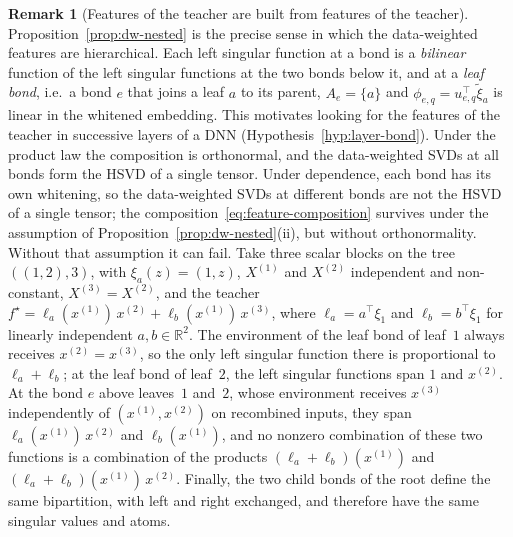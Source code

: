 \documentclass[11pt]{article}
\newcommand{\R}{\mathbb{R}}
\theoremstyle{definition}
\newtheorem{remark}[theorem]{Remark}
\numberwithin{equation}{section}
\begin{document}
\begin{remark}[Features of the teacher are built from features of the teacher]\label{rem:dw-nested}
Proposition~\ref{prop:dw-nested} is the precise sense in which the data-weighted features are hierarchical. Each left singular function at a bond is a \emph{bilinear} function of the left singular functions at the two bonds below it, and at a \emph{leaf bond}, i.e.\ a bond $e$ that joins a leaf $a$ to its parent, $A_e=\{a\}$ and $\phi_{e,q}=u^\top_{e,q}\tilde\xi_a$ is linear in the whitened embedding. This motivates looking for the features of the teacher in successive layers of a DNN (Hypothesis~\ref{hyp:layer-bond}). Under the product law the composition is orthonormal, and the data-weighted SVDs at all bonds form the HSVD of a single tensor. Under dependence, each bond has its own whitening, so the data-weighted SVDs at different bonds are not the HSVD of a single tensor; the composition~\eqref{eq:feature-composition} survives under the assumption of Proposition~\ref{prop:dw-nested}(ii), but without orthonormality. Without that assumption it can fail. Take three scalar blocks on the tree $((1,2),3)$, with $\xi_a(z)=(1,z)$, $X^{(1)}$ and $X^{(2)}$ independent and non-constant, $X^{(3)}=X^{(2)}$, and the teacher $f^\star=\ell_a(x^{(1)})\,x^{(2)}+\ell_b(x^{(1)})\,x^{(3)}$, where $\ell_a=a^\top\xi_1$ and $\ell_b=b^\top\xi_1$ for linearly independent $a,b\in\R^2$. The environment of the leaf bond of leaf~$1$ always receives $x^{(2)}=x^{(3)}$, so the only left singular function there is proportional to $\ell_a+\ell_b$; at the leaf bond of leaf~$2$, the left singular functions span $1$ and $x^{(2)}$. At the bond $e$ above leaves~$1$ and~$2$, whose environment receives $x^{(3)}$ independently of $(x^{(1)},x^{(2)})$ on recombined inputs, they span $\ell_a(x^{(1)})\,x^{(2)}$ and $\ell_b(x^{(1)})$, and no nonzero combination of these two functions is a combination of the products $(\ell_a+\ell_b)(x^{(1)})$ and $(\ell_a+\ell_b)(x^{(1)})\,x^{(2)}$. Finally, the two child bonds of the root define the same bipartition, with left and right exchanged, and therefore have the same singular values and atoms.
\end{remark}
\end{document}
